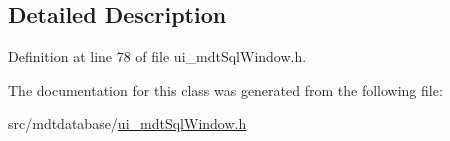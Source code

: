 \subsection{Detailed Description}


Definition at line 78 of file ui\-\_\-mdt\-Sql\-Window.\-h.



The documentation for this class was generated from the following file\-:\begin{DoxyCompactItemize}
\item 
src/mdtdatabase/\hyperlink{mdtdatabase_2ui__mdt_sql_window_8h}{ui\-\_\-mdt\-Sql\-Window.\-h}\end{DoxyCompactItemize}
